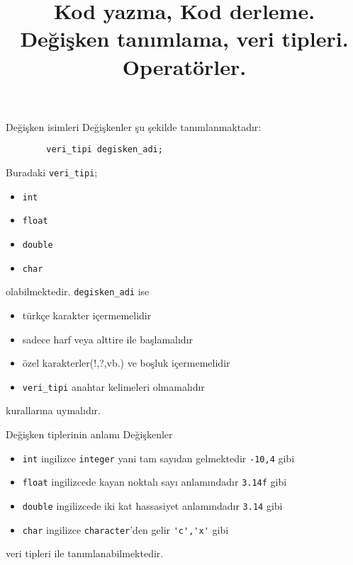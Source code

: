
\title[Ders 1] {Kod yazma, Kod derleme. Değişken tanımlama, veri tipleri. Operatörler.}

\frame{\titlepage}
\begin{frame}[fragile]{Değişken isimleri}
    Değişkenler şu şekilde tanımlanmaktadır:
    \begin{lstlisting}
        veri_tipi degisken_adi;\end{lstlisting}
    Buradaki \lstinline{veri_tipi};
    \begin{itemize}
        \item \lstinline{int} 
        \item \lstinline{float}
        \item \lstinline{double}
        \item \lstinline{char}
    \end{itemize}
     olabilmektedir. \lstinline{degisken_adi} ise 
    \begin{itemize}
     \item türkçe karakter içermemelidir
     \item sadece harf veya alttire ile başlamalıdır
     \item özel karakterler(!,?,vb.) ve boşluk içermemelidir
     \item \lstinline{veri_tipi} anahtar kelimeleri olmamalıdır
    \end{itemize}
    kurallarına uymalıdır.
\end{frame}
\begin{frame}[fragile]{Değişken tiplerinin anlamı}
    Değişkenler
    \begin{itemize}
     \item \lstinline{int} ingilizce \verb|integer| yani tam sayıdan gelmektedir \lstinline{-10,4} gibi
     \item \lstinline{float} ingilizcede kayan noktalı sayı anlamındadır \lstinline{3.14f} gibi
     \item \lstinline{double} ingilizcede iki kat hassasiyet anlamındadır \lstinline{3.14} gibi
     \item \lstinline{char} ingilizce \verb|character|'den gelir \lstinline{'c','x'} gibi
    \end{itemize}
    veri tipleri ile tanımlanabilmektedir.
\end{frame}
\begin{frame}[fragile]
    
\end{frame}

